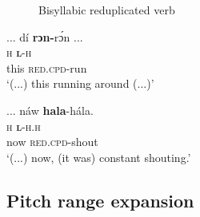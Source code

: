 \begin{figure}
\caption{Bisyllabic reduplicated verb}
\label{fig:key:3.22} 
\end{figure}
 
\ea%
    \label{ex:key:60}
    \glll  \op...\cp{}  dí  \textbf{rɔn-}rɔ́n \op...\cp\\
{} \textsc{h}  \textbf{\textsc{l}}\textsc{{}-h}\\
{} this  \textsc{red.cpd-}run\\
\glt ‘(...) this running around (...)’
\z

\ea
	\label{ex:key:61}
\glll  \op...\cp{}  náw    \textbf{hala}{}-hála.\\
{} \textsc{h}    \textbf{\textsc{l}}\textsc{{}-h.h}\\
{} now    \textsc{red.cpd}{}-shout\\
\glt ‘(...) now, (it was) constant shouting.’\\
\z

\subsection{Pitch range expansion}\label{sec:3.2.5}

